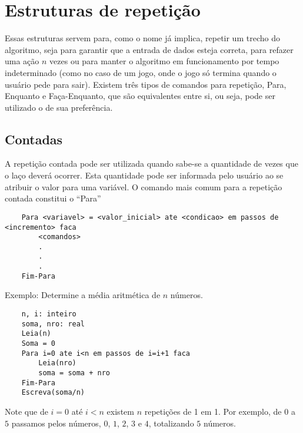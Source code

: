 \chapter{Estruturas de repetição}
Essas estruturas servem para, como o nome já implica, repetir um trecho do algoritmo, seja para garantir que a entrada de dados esteja correta, para refazer uma ação $n$ vezes ou para manter o algoritmo em funcionamento por tempo indeterminado (como no caso de um jogo, onde o jogo só termina quando o usuário pede para sair). Existem três tipos de comandos para repetição, Para, Enquanto e Faça-Enquanto, que são equivalentes entre si, ou seja, pode ser utilizado o de sua preferência.
\section{Contadas}
A repetição contada pode ser utilizada quando sabe-se a quantidade de vezes que o laço deverá ocorrer. Esta quantidade pode ser informada pelo usuário ao se atribuir o valor para uma variável. O comando mais comum para a repetição contada constitui o ``Para''\\
\begin{lstlisting}
    Para <variavel> = <valor_inicial> ate <condicao> em passos de <incremento> faca
        <comandos>
        .
        .
        .
    Fim-Para
\end{lstlisting}
Exemplo: Determine a média aritmética de $n$ números.
\begin{lstlisting}
    n, i: inteiro
    soma, nro: real
    Leia(n)
    Soma = 0
    Para i=0 ate i<n em passos de i=i+1 faca
        Leia(nro)
        soma = soma + nro
    Fim-Para
    Escreva(soma/n)
\end{lstlisting}
Note que de $i = 0$ até $i < n$ existem $n$ repetições de 1 em 1. Por exemplo, de $0$ a $5$ passamos pelos números, $0$, $1$, $2$, $3$ e $4$, totalizando $5$ números.

